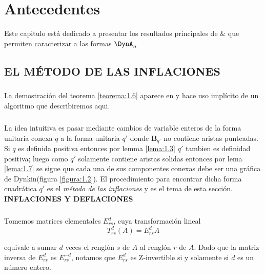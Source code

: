 \chapter{Antecedentes}
\begin{center}
Este capitulo está dedicado a presentar los resultados principales de \citep{alma991031505829703276} \& \citep{Barot1999ACO} que permiten caracterizar a las formas $\DynA_{n}$
\end{center}

\section{EL MÉTODO DE LAS INFLACIONES}\label{sec:2.1}

\paragraph{}
La demostración del teorema \ref{teorema:1.6} aparece en \citep{alma991031505829703276} y hace uso implícito de un algoritmo que describiremos aqui.

\paragraph{}
La idea intuitiva es pasar mediante cambios de variable enteros de la forma unitaria conexa $q$ a la forma unitaria $q'$ donde $\textbf{B}_{q'}$ no contiene aristas punteadas. Si $q$ es definida positiva entonces por lemma \ref{lema:1.3} $q'$ tambien es definidad positiva; luego como $q'$ solamente contiene aristas solidas entonces por lema \ref{lema:1.7} se sigue que cada una de sus componentes conexas debe ser una gráfica de Dynkin(figura \ref{figura:1.2}). El procedimiento para encontrar dicha forma cuadrática $q'$ es el \textit{método de las inflaciones} y es el tema de esta sección.\\

\textbf{INFLACIONES Y DEFLACIONES}

\paragraph{}
Tomemos matrices elementales $E_{rs}^{d}$, cuya transformación lineal 
\begin{equation*}
    T_{rs}^{d}\left(A\right) = E_{rs}^{d}A
\end{equation*}

equivale a sumar $d$ veces el renglón $s$ de $A$ al renglón $r$ de $A$. Dado que la matriz inversa de $E_{rs}^{d}$ es $E_{rs}^{-d}$, notamos que $E_{rs}^{d}$ es $\mathrm{Z}$-invertible si y solamente si $d$ es un número entero.

